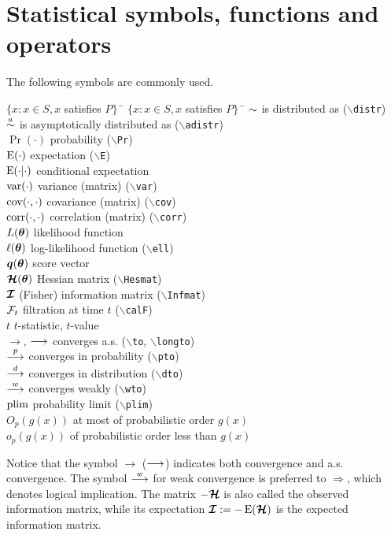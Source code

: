 \documentclass[11pt,dvips,a4paper]{article}
\newcommand{\hspacesymbols}%
   {$\{x: x \in S, x$ satisfies $P\}\;\;$} %
\newcommand{\type}[1]{{\tt$\backslash$#1}}
\begin{document}
\section{Statistical symbols, functions and operators}
The following symbols are commonly used.
\begin{tabbing}
\hspacesymbols \= \hspacesymbols\qquad\quad \=  \kill
$\sim$ \> is distributed as (\type{distr})  \\
$\stackrel{a}{\sim}$ \> is asymptotically distributed as (\type{adistr}) \\
$\Pr(\cdot)$ \> probability (\type{Pr})  \\
$\operatorname{E}(\cdot)$ \> expectation (\type{E})  \\
$\operatorname{E}(\cdot|\cdot)$ \> conditional expectation \\
$\operatorname{var}(\cdot)$ \> variance (matrix) (\type{var})   \\
$\operatorname{cov}(\cdot,\cdot)$ \> covariance (matrix) (\type{cov})   \\
$\operatorname{corr}(\cdot,\cdot)$ \> correlation (matrix) (\type{corr})  \\
$L(\bm \theta)$ \> likelihood function \\
$\ell(\bm \theta)$ \> log-likelihood function (\type{ell}) \\
$\bm q(\bm \theta)$ \> score vector \\
$\bm{\mathcal{H}}(\bm \theta)$ \> Hessian matrix (\type{Hesmat}) \\
$\bm{\mathcal{I}}$ \> (Fisher) information matrix (\type{Infmat})   \\
$\mathcal{F}_t$ \> filtration at time $t$ (\type{calF})\\
$t$ \> $t$-statistic, $t$-value \\
$\to$, $\longrightarrow$ \> converges a.s. (\type{to}, \type{longto}) \\
$\stackrel{p}{\longrightarrow}$ \> converges in probability (\type{pto}) \\
$\stackrel{d}{\longrightarrow}$ \> converges in distribution (\type{dto}) \\
$\stackrel{w}{\longrightarrow}$ \> converges weakly (\type{wto}) \\
$\operatorname{plim}$ \> probability limit (\type{plim}) \\
$O_p(g(x))$ \> at most of probabilistic order $g(x)$ \\
$o_p(g(x))$ \> of probabilistic order less than $g(x)$
\end{tabbing}
Notice that the symbol $\to$ ($\longrightarrow$) indicates both convergence
and a.s. convergence.
The symbol $\stackrel{w}{\longrightarrow}$ for weak convergence is preferred to
$\Longrightarrow$, which denotes logical implication.
The matrix $-\bm{\mathcal{H}}$ is also called the observed information matrix,
while its expectation
$\bm{\mathcal{I}}:=-\operatorname{E}(\bm{\mathcal{H}})$ is the expected information matrix.
\end{document}
